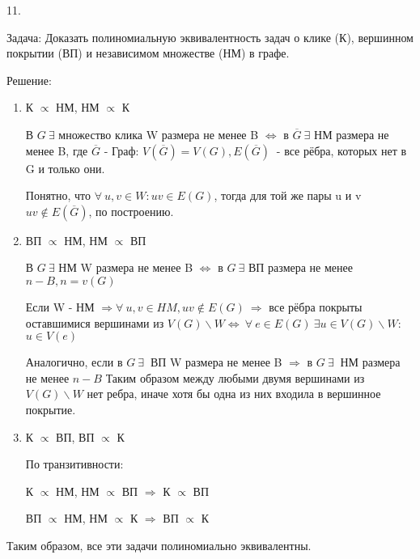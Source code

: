 \documentclass[12pt]{article}
\begin{document}
11. 

Задача: Доказать полиномиальную эквивалентность задач о клике (К),
вершинном покрытии (ВП) и независимом множестве (НМ) в графе.

Решение:

\begin{enumerate}
    \item К $\propto$ НМ, НМ $\propto$ К

        В $G ~\exists$ множество клика W размера не менее B $\iff$ 
        в $\overline{G} ~\exists$ НМ размера не менее B, где
        $\overline{G}$ - Граф: $V(\overline{G}) = V(G), E(\overline{G})~$ 
        - все рёбра, которых нет в G и только они.

        Понятно, что $\forall ~ u,v \in W: uv \in E(G)$, тогда для той же
        пары u и v $uv \notin E(\overline{G})$, по построению.

    \item ВП $\propto$ НМ, НМ $\propto$ ВП

        В $G~\exists$ НМ W размера не менее B $\iff$
        в $G~\exists$ ВП размера не менее $n-B, n=v(G)$ 

        Если W - НМ $\Rightarrow \forall ~ u,v \in HM, uv \notin E(G) ~ \Rightarrow$
        все рёбра покрыты оставшимися вершинами из 
        $ V(G) \backslash W \iff ~ \forall ~ e \in E(G) ~ \exists u \in V(G) \backslash W:$
        $u \in V(e)$

        Аналогично, если в $G~ \exists ~ $ ВП W размера не менее B $\Rightarrow$ в $G ~ \exists ~$ НМ
        размера не менее $n-B$
        Таким образом между любыми двумя вершинами из $V(G) \backslash W$ нет ребра, иначе хотя бы
        одна из них входила в вершинное покрытие.

    \item К $\propto$ ВП, ВП $\propto$ К

        По транзитивности:

        К $\propto$ НМ, НМ $\propto$ ВП $\Rightarrow$ К $\propto$ ВП

        ВП $\propto$ НМ, НМ $\propto$ К $\Rightarrow$ ВП $\propto$ К
\end{enumerate}

Таким образом, все эти задачи полиномиально эквивалентны.
\end{document}
